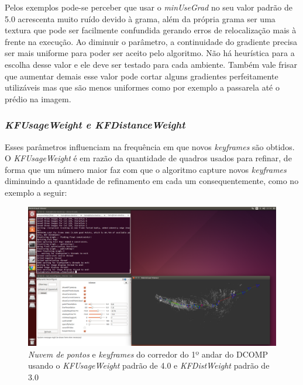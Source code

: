 Pelos exemplos pode-se perceber que usar o \textit{minUseGrad} no seu valor padrão de 5.0 acrescenta muito ruído devido à grama, além da própria grama ser uma textura que pode ser facilmente confundida gerando erros de relocalização mais à frente na execução. Ao diminuir o parâmetro, a continuidade do gradiente precisa ser mais uniforme para poder ser aceito pelo algoritmo. Não há heurística para a escolha desse valor e ele deve ser testado para cada ambiente. Também vale frisar que aumentar demais esse valor pode cortar alguns gradientes perfeitamente utilizáveis mas que são menos uniformes como por exemplo a passarela até o prédio na imagem.

\subsubsection{\textit{KFUsageWeight e KFDistanceWeight}}


Esses parâmetros influenciam na frequência em que novos \textit{keyframes} são obtidos. O \textit{KFUsageWeight} é em razão da quantidade de quadros usados para refinar, de forma que um número maior faz com que o algoritmo capture novos \textit{keyframes} diminuindo a quantidade de refinamento em cada um consequentemente, como no exemplo a seguir:

\begin{figure}[H]
	\centering
		\includegraphics[width= \textwidth]{Imagens/figura3-33.png}
	\caption{\textit{Nuvem de pontos} e \textit{keyframes} do corredor do 1º andar do DCOMP usando o \textit{KFUsageWeight} padrão de 4.0 e \textit{KFDistWeight} padrão de 3.0}
	\label{fig3:31}
\end{figure}

